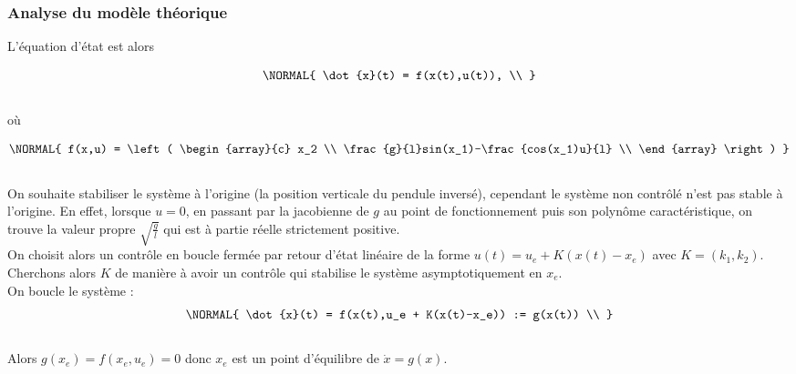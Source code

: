 \documentclass[11pt,french]{article} %
\begin{document}
\subsubsection{Analyse du modèle théorique}

L'équation d'état est alors

\begin{equation}
	\NORMAL{
			\dot{x}(t) = f(x(t),u(t)), \\
	}
\end{equation}\\

où 

\begin{equation}
	\NORMAL{
		f(x,u) = 
		\left(
		\begin{array}{c}
			x_2 \\
			\frac{g}{l}sin(x_1)-\frac{cos(x_1)u}{l} \\
    \end{array}
  \right)
	}
\end{equation}\\


On souhaite stabiliser le système à l'origine (la position verticale du pendule inversé), cependant le système non contrôlé n'est pas stable à l'origine. En effet, lorsque $u = 0$, en passant par la jacobienne de $g$ au point de fonctionnement puis son polynôme caractéristique, on trouve la valeur propre $\sqrt{\frac{g}{l}}$ qui est à partie réelle strictement positive.\\


On choisit alors un contrôle en boucle fermée par retour d'état linéaire de la forme $u(t) = u_e + K(x(t) - x_e)$ avec $K = (k_1, k_2)$. Cherchons alors $K$ de manière à avoir un contrôle qui stabilise le système asymptotiquement en $x_e$.\\

On boucle le système :\\

\begin{equation}
	\NORMAL{
			\dot{x}(t) = f(x(t),u_e + K(x(t)-x_e)) := g(x(t)) \\
	}
\end{equation}\\

Alors $g(x_e) = f(x_e, u_e) = 0$ donc $x_e$ est un point d'équilibre de $\dot{x} = g(x)$. \\
\end{document}
